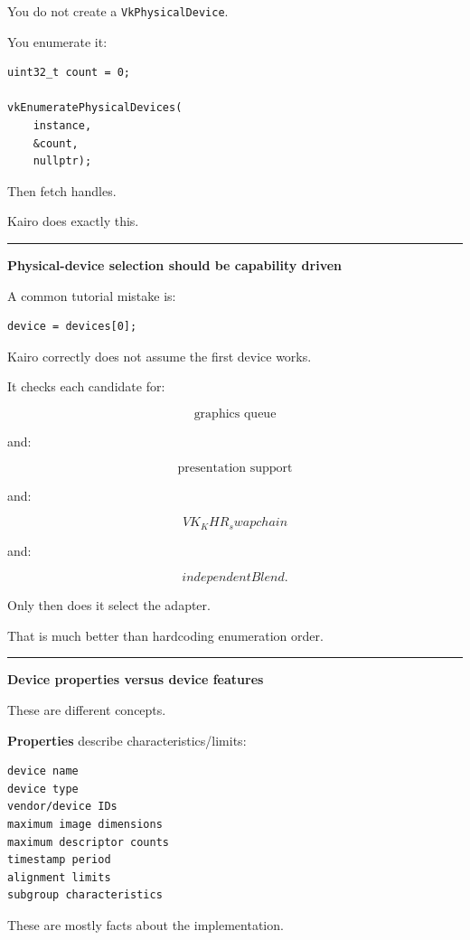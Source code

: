 You do not create a \texttt{VkPhysicalDevice}.

You enumerate it:

\begin{verbatim}
uint32_t count = 0;

vkEnumeratePhysicalDevices(
    instance,
    &count,
    nullptr);
\end{verbatim}

Then fetch handles.

Kairo does exactly this.

\begin{center}\rule{0.5\linewidth}{0.5pt}\end{center}

\textbf{Physical-device selection should be capability driven}

A common tutorial mistake is:

\begin{verbatim}
device = devices[0];
\end{verbatim}

Kairo correctly does not assume the first device works.

It checks each candidate for:

\[
\text{graphics queue}
\]

and:

\[
\text{presentation support}
\]

and:

\[
VK_KHR_swapchain
\]

and:

\[
independentBlend.
\]

Only then does it select the adapter.

That is much better than hardcoding enumeration order.

\begin{center}\rule{0.5\linewidth}{0.5pt}\end{center}

\textbf{Device properties versus device features}

These are different concepts.

\textbf{Properties} describe characteristics/limits:

\begin{verbatim}
device name
device type
vendor/device IDs
maximum image dimensions
maximum descriptor counts
timestamp period
alignment limits
subgroup characteristics
\end{verbatim}

These are mostly facts about the implementation.

